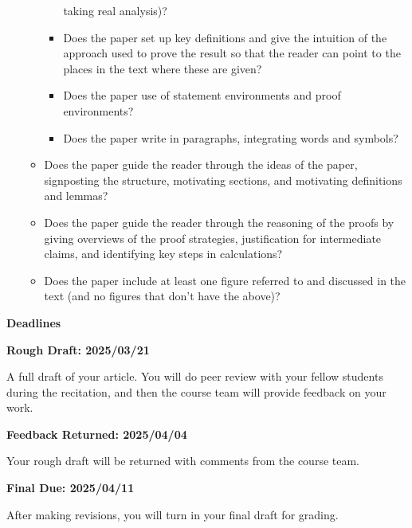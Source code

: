 \documentclass{article}
\begin{document}
\begin{itemize}
\begin{itemize}
\begin{itemize}
                            taking real analysis)?
                        \item
                            Does the paper set up key definitions and give the
                            intuition of the approach used to prove the result
                            so that the reader can point to the places in the
                            text where these are given?
                        \item
                            Does the paper use of statement environments
                            and proof environments?
                        \item
                            Does the paper write in paragraphs,
                            integrating words and symbols?
                    \end{itemize}
                \item
                    Does the paper guide the reader through the ideas of the
                    paper, signposting the structure, motivating sections, and
                    motivating definitions and lemmas?
                \item
                    Does the paper guide the reader through the reasoning of
                    the proofs by giving overviews of the proof strategies,
                    justification for intermediate claims,
                    and identifying key steps in calculations?
                \item
                    Does the paper include at least one figure referred to and
                    discussed in the text (and no figures that don't have the
                    above)?
            \end{itemize}
    \end{itemize}
    \par\hfill\par
    \textbf{\Large{Deadlines}}
    \par\hfill\par
    \textbf{Rough Draft: 2025/03/21}
    \par
    A full draft of your article. You will do peer review with your fellow
    students during the recitation, and then the course team will provide
    feedback on your work.
    \par\hfill\par
    \textbf{Feedback Returned: 2025/04/04}
    \par
    Your rough draft will be returned with comments from the course team.
    \par\hfill\par
    \textbf{Final Due: 2025/04/11}
    \par
    After making revisions, you will turn in your final draft for grading.
    \par\hfill\par
\end{document}
